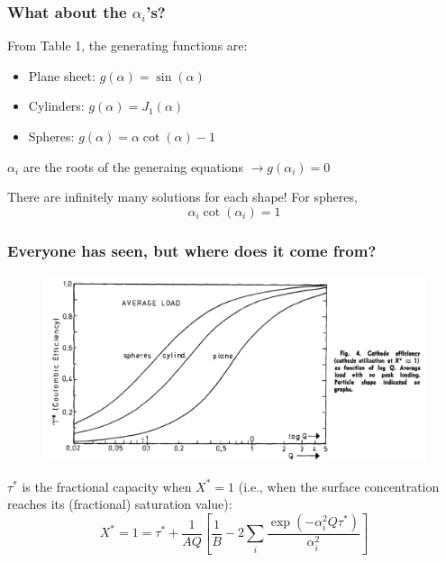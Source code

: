 \documentclass{beamer}
\begin{document}
\begin{frame}
\frametitle{What about the $\alpha_i$'s?}

From Table 1, the generating functions are:

\begin{itemize}
	\item Plane sheet: $g(\alpha) = \sin(\alpha)$
	\item Cylinders: $g(\alpha) = J_1(\alpha)$
	\item Spheres: $g(\alpha) = \alpha \cot(\alpha) - 1$
\end{itemize}

$\alpha_i$ are the roots of the generaing equations $\rightarrow g(\alpha_i) = 0$

There are infinitely many solutions for each shape! For spheres, 
\begin{equation*}
\alpha_i \cot(\alpha_i) = 1
\end{equation*}
 
\end{frame}

\begin{frame}
\frametitle{Everyone has seen, but where does it come from?}

\vspace{-0.45cm}
\begin{figure}
	\includegraphics[width=0.75\linewidth]{figs/tau_vs_Q-original.pdf}
\end{figure}

\vspace{-0.1cm}
$\tau^*$ is the fractional capacity when $X^*=1$ (i.e., when the surface concentration reaches its (fractional) saturation value):
\begin{equation*}
X^* = 1 = \tau^* + \frac{1}{AQ} \left[ \frac{1}{B} - 2 \sum_{i}\frac{\exp(-\alpha_i^2 Q\tau^*)}{\alpha_i^2}  \right]
\end{equation*}

\end{frame}
\end{document}
